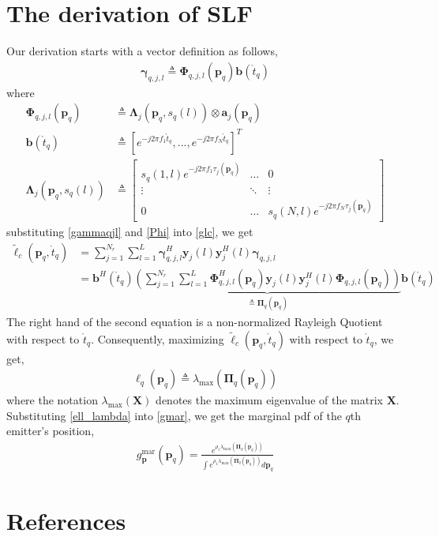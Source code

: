 \documentclass[review]{elsarticle}
\begin{document}
\section{The derivation of SLF}\label{ApA}
Our derivation starts with a vector definition as follows,
\begin{align}\label{gammaqjl}
    \boldsymbol{\gamma}_{q,j,l}\triangleq\boldsymbol{\Phi}_{q,j,l}(\boldsymbol{p}_q)\boldsymbol{b}(\mathring{t}_q)
\end{align}
where
\begin{align}\label{Phi}
    \boldsymbol{\Phi}_{q,j,l}(\boldsymbol{p}_q)&\triangleq\boldsymbol{\Lambda}_j(\boldsymbol{p}_q,s_q(l))\otimes \boldsymbol{a}_j(\boldsymbol{p}_q)\\
    \boldsymbol{b}(\mathring{t}_q)&\triangleq[e^{-j2\pi f_1\mathring{t}_q},...,e^{-j2\pi f_N\mathring{t}_q}]^T\\
    \boldsymbol{\Lambda}_j(\boldsymbol{p}_q,s_q(l))&\triangleq 
    \left[ 
    \begin{array}{ccc}
        s_q(1,l)e^{-j2\pi f_1\tau_j(\boldsymbol{p}_q)}& \ldots & 0\\
        \vdots&\ddots&\vdots\\
        0&\ldots&s_q(N,l)e^{-j2\pi f_N\tau_j(\boldsymbol{p}_q)}
    \end{array}
    \right ]   
\end{align}
substituting \eqref{gammaqjl} and \eqref{Phi} into \eqref{glc}, we get
\begin{align}
    \tilde{\ell}_c(\boldsymbol{p}_q,\mathring{t}_q)&= \sum_{j=1}^{N_r} \sum_{l=1}^{L} \boldsymbol{\gamma}_{q,j,l}^H\boldsymbol{y}_j(l)\boldsymbol{y}_j^H(l)\boldsymbol{\gamma}_{q,j,l}\\
    &=\boldsymbol{b}^H(\mathring{t}_q)\underbrace{\left(\sum_{j=1}^{N_r} \sum_{l=1}^{L} \boldsymbol{\Phi}^H_{q,j,l}(\boldsymbol{p}_q)\boldsymbol{y}_j(l)\boldsymbol{y}_j^H(l)\boldsymbol{\Phi}_{q,j,l}(\boldsymbol{p}_q)\right)}_{\triangleq\boldsymbol{\Pi}_q(\boldsymbol{p}_q)} \boldsymbol{b}(\mathring{t}_q)
\end{align}
The right hand of the second equation is a non-normalized Rayleigh Quotient with respect to $\mathring{t}_q$. Consequently, maximizing $\tilde{\ell}_c(\boldsymbol{p}_q,\mathring{t}_q)$ with respect to $\mathring{t}_q$, we get,
\begin{align}\label{ell_lambda}
    \ell_q(\boldsymbol{p}_q)\triangleq\lambda_{\text{max}}(\boldsymbol{\Pi}_q(\boldsymbol{p}_q))
\end{align}
where the notation $\lambda_{\text{max}}(\boldsymbol{X})$ denotes the maximum eigenvalue of the matrix $\boldsymbol{X}$. Substituting \eqref{ell_lambda} into \eqref{gmar}, we get the marginal pdf of the $q$th emitter's position,
\begin{align}\label{gpq}
    g_{\boldsymbol{p}}^{\text{mar}}(\boldsymbol{p}_q)=\frac{e^{\rho_1\lambda_{\text{max}}(\boldsymbol{\Pi}_q(\boldsymbol{p}_q))}}{\int e^{\rho_1\lambda_{\text{max}}(\boldsymbol{\Pi}_q(\boldsymbol{p}_q))} d\boldsymbol{p}_q}
\end{align}

\section*{References}

\end{document}
